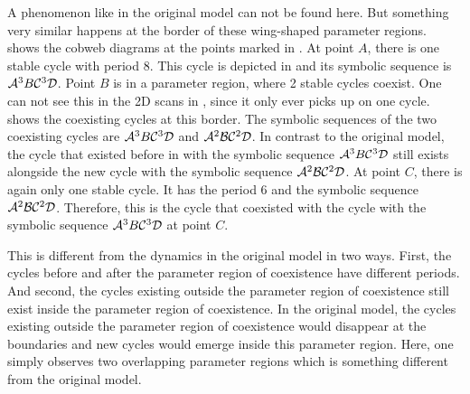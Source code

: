 A phenomenon like in the original model can not be found here.
But something very similar happens at the border of these wing-shaped parameter regions.
 shows the cobweb diagrams at the points marked in .
At point $A$, there is one stable cycle with period $8$.
This cycle is depicted in  and its symbolic sequence is $\mathcal{A}^3B\mathcal{C}^3\mathcal{D}$.
Point $B$ is in a parameter region, where 2 stable cycles coexist.
One can not see this in the 2D scans in , since it only ever picks up on one cycle.
 shows the coexisting cycles at this border.
The symbolic sequences of the two coexisting cycles are $\mathcal{A}^3B\mathcal{C}^3\mathcal{D}$ and $\mathcal{A}^2\mathcal{B}\mathcal{C}^2\mathcal{D}$.
In contrast to the original model, the cycle that existed before in  with the symbolic sequence $\mathcal{A}^3B\mathcal{C}^3\mathcal{D}$ still exists alongside the new cycle with the symbolic sequence $\mathcal{A}^2\mathcal{B}\mathcal{C}^2\mathcal{D}$.
At point $C$, there is again only one stable cycle.
It has the period $6$ and the symbolic sequence $\mathcal{A}^2\mathcal{B}\mathcal{C}^2\mathcal{D}$.
Therefore, this is the cycle that coexisted with the cycle with the symbolic sequence $\mathcal{A}^3B\mathcal{C}^3\mathcal{D}$ at point $C$.

This is different from the dynamics in the original model in two ways.
First, the cycles before and after the parameter region of coexistence have different periods.
And second, the cycles existing outside the parameter region of coexistence still exist inside the parameter region of coexistence.
In the original model, the cycles existing outside the parameter region of coexistence would disappear at the boundaries and new cycles would emerge inside this parameter region.
Here, one simply observes two overlapping parameter regions which is something different from the original model.
